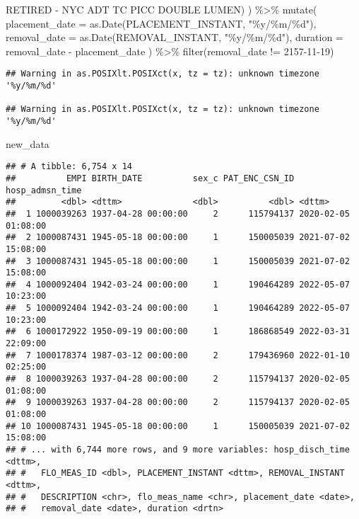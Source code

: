 \documentclass[
]{article}
\newenvironment{Shaded}{\begin{snugshade}}{\end{snugshade}}
\newcommand{\AttributeTok}[1]{\textcolor[rgb]{0.77,0.63,0.00}{#1}}
\newcommand{\FunctionTok}[1]{\textcolor[rgb]{0.00,0.00,0.00}{#1}}
\newcommand{\NormalTok}[1]{#1}
\newcommand{\SpecialCharTok}[1]{\textcolor[rgb]{0.00,0.00,0.00}{#1}}
\newcommand{\StringTok}[1]{\textcolor[rgb]{0.31,0.60,0.02}{#1}}
\begin{document}
\begin{Shaded}
\begin{Highlighting}[]
                                \StringTok{\textquotesingle{}RETIRED {-} NYC ADT TC PICC DOUBLE LUMEN\textquotesingle{}}\NormalTok{)}
\NormalTok{         ) }\SpecialCharTok{\%\textgreater{}\%} 
  \FunctionTok{mutate}\NormalTok{(}
    \AttributeTok{placement\_date =} \FunctionTok{as.Date}\NormalTok{(PLACEMENT\_INSTANT, }\StringTok{"\%y/\%m/\%d"}\NormalTok{),}
    \AttributeTok{removal\_date =} \FunctionTok{as.Date}\NormalTok{(REMOVAL\_INSTANT, }\StringTok{"\%y/\%m/\%d"}\NormalTok{),}
    \AttributeTok{duration =}\NormalTok{ removal\_date }\SpecialCharTok{{-}}\NormalTok{ placement\_date}
\NormalTok{  ) }\SpecialCharTok{\%\textgreater{}\%} 
  \FunctionTok{filter}\NormalTok{(removal\_date }\SpecialCharTok{!=} \StringTok{\textquotesingle{}2157{-}11{-}19\textquotesingle{}}\NormalTok{)}
\end{Highlighting}
\end{Shaded}

\begin{verbatim}
## Warning in as.POSIXlt.POSIXct(x, tz = tz): unknown timezone '%y/%m/%d'

## Warning in as.POSIXlt.POSIXct(x, tz = tz): unknown timezone '%y/%m/%d'
\end{verbatim}

\begin{Shaded}
\begin{Highlighting}[]
\NormalTok{new\_data}
\end{Highlighting}
\end{Shaded}

\begin{verbatim}
## # A tibble: 6,754 x 14
##          EMPI BIRTH_DATE          sex_c PAT_ENC_CSN_ID hosp_admsn_time    
##         <dbl> <dttm>              <dbl>          <dbl> <dttm>             
##  1 1000039263 1937-04-28 00:00:00     2      115794137 2020-02-05 01:08:00
##  2 1000087431 1945-05-18 00:00:00     1      150005039 2021-07-02 15:08:00
##  3 1000087431 1945-05-18 00:00:00     1      150005039 2021-07-02 15:08:00
##  4 1000092404 1942-03-24 00:00:00     1      190464289 2022-05-07 10:23:00
##  5 1000092404 1942-03-24 00:00:00     1      190464289 2022-05-07 10:23:00
##  6 1000172922 1950-09-19 00:00:00     1      186868549 2022-03-31 22:09:00
##  7 1000178374 1987-03-12 00:00:00     2      179436960 2022-01-10 02:25:00
##  8 1000039263 1937-04-28 00:00:00     2      115794137 2020-02-05 01:08:00
##  9 1000039263 1937-04-28 00:00:00     2      115794137 2020-02-05 01:08:00
## 10 1000087431 1945-05-18 00:00:00     1      150005039 2021-07-02 15:08:00
## # ... with 6,744 more rows, and 9 more variables: hosp_disch_time <dttm>,
## #   FLO_MEAS_ID <dbl>, PLACEMENT_INSTANT <dttm>, REMOVAL_INSTANT <dttm>,
## #   DESCRIPTION <chr>, flo_meas_name <chr>, placement_date <date>,
## #   removal_date <date>, duration <drtn>
\end{verbatim}
\end{document}
